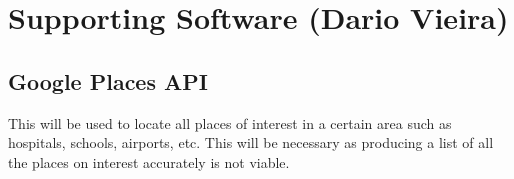 \documentclass[11pt]{article}
\begin{document}
	
	
	
	\section{Supporting Software (Dario Vieira)}
		\subsection{Google Places API}
		\begin{flushleft}
			This will be used to locate all places of interest in a certain area such as hospitals, schools, airports, etc. This will be necessary as producing a list of all the places on interest accurately is not viable.
		\end{flushleft}
\end{document}

